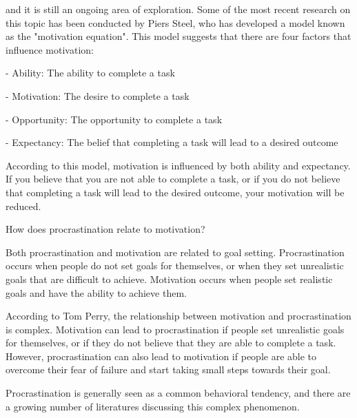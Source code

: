 and it is still an ongoing area of exploration. Some of the most recent research on this topic has been conducted by Piers Steel, who has developed a model known as the "motivation equation". This model suggests that there are four factors that influence motivation:


- Ability: The ability to complete a task

- Motivation: The desire to complete a task

- Opportunity: The opportunity to complete a task

- Expectancy: The belief that completing a task will lead to a desired outcome


According to this model, motivation is influenced by both ability and expectancy. If you believe that you are not able to complete a task, or if you do not believe that completing a task will lead to the desired outcome, your motivation will be reduced.




How does procrastination relate to motivation?

Both procrastination and motivation are related to goal setting. Procrastination occurs when people do not set goals for themselves, or when they set unrealistic goals that are difficult to achieve. Motivation occurs when people set realistic goals and have the ability to achieve them.


According to Tom Perry, the relationship between motivation and procrastination is complex. Motivation can lead to procrastination if people set unrealistic goals for themselves, or if they do not believe that they are able to complete a task. However, procrastination can also lead to motivation if people are able to overcome their fear of failure and start taking small steps towards their goal.


Procrastination is generally seen as a common behavioral tendency, and there are a growing number of literatures discussing this complex phenomenon.


